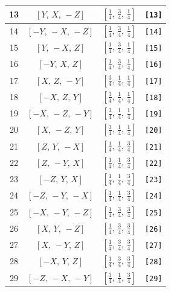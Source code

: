 \documentclass[fleqn,8pt]{jsarticle}
\begin{document}
\begin{longtable}{cccc}
13 & $\left[ Y,\, X,\, - Z \right]$ & $\left[ \frac{1}{4},\, \frac{3}{4},\, \frac{1}{4} \right]$ & {\tt [13]} \\ \hline
14 & $\left[ - Y,\, - X,\, - Z \right]$ & $\left[ \frac{1}{4},\, \frac{3}{4},\, \frac{1}{4} \right]$ & {\tt [14]} \\ \hline
15 & $\left[ Y,\, - X,\, Z \right]$ & $\left[ \frac{1}{4},\, \frac{3}{4},\, \frac{1}{4} \right]$ & {\tt [15]} \\ \hline
16 & $\left[ - Y,\, X,\, Z \right]$ & $\left[ \frac{1}{4},\, \frac{3}{4},\, \frac{1}{4} \right]$ & {\tt [16]} \\ \hline
17 & $\left[ X,\, Z,\, - Y \right]$ & $\left[ \frac{3}{4},\, \frac{1}{4},\, \frac{1}{4} \right]$ & {\tt [17]} \\ \hline
18 & $\left[ - X,\, Z,\, Y \right]$ & $\left[ \frac{3}{4},\, \frac{1}{4},\, \frac{1}{4} \right]$ & {\tt [18]} \\ \hline
19 & $\left[ - X,\, - Z,\, - Y \right]$ & $\left[ \frac{3}{4},\, \frac{1}{4},\, \frac{1}{4} \right]$ & {\tt [19]} \\ \hline
20 & $\left[ X,\, - Z,\, Y \right]$ & $\left[ \frac{3}{4},\, \frac{1}{4},\, \frac{1}{4} \right]$ & {\tt [20]} \\ \hline
21 & $\left[ Z,\, Y,\, - X \right]$ & $\left[ \frac{1}{4},\, \frac{1}{4},\, \frac{3}{4} \right]$ & {\tt [21]} \\ \hline
22 & $\left[ Z,\, - Y,\, X \right]$ & $\left[ \frac{1}{4},\, \frac{1}{4},\, \frac{3}{4} \right]$ & {\tt [22]} \\ \hline
23 & $\left[ - Z,\, Y,\, X \right]$ & $\left[ \frac{1}{4},\, \frac{1}{4},\, \frac{3}{4} \right]$ & {\tt [23]} \\ \hline
24 & $\left[ - Z,\, - Y,\, - X \right]$ & $\left[ \frac{1}{4},\, \frac{1}{4},\, \frac{3}{4} \right]$ & {\tt [24]} \\ \hline
25 & $\left[ - X,\, - Y,\, - Z \right]$ & $\left[ \frac{1}{4},\, \frac{3}{4},\, \frac{3}{4} \right]$ & {\tt [25]} \\ \hline
26 & $\left[ X,\, Y,\, - Z \right]$ & $\left[ \frac{1}{4},\, \frac{3}{4},\, \frac{3}{4} \right]$ & {\tt [26]} \\ \hline
27 & $\left[ X,\, - Y,\, Z \right]$ & $\left[ \frac{1}{4},\, \frac{3}{4},\, \frac{3}{4} \right]$ & {\tt [27]} \\ \hline
28 & $\left[ - X,\, Y,\, Z \right]$ & $\left[ \frac{1}{4},\, \frac{3}{4},\, \frac{3}{4} \right]$ & {\tt [28]} \\ \hline
29 & $\left[ - Z,\, - X,\, - Y \right]$ & $\left[ \frac{3}{4},\, \frac{1}{4},\, \frac{3}{4} \right]$ & {\tt [29]} \\ \hline

\end{longtable}
\end{document}
